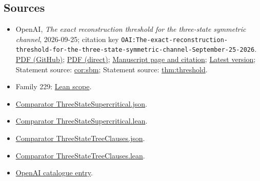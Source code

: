 \documentclass[11pt]{article}
\begin{document}
\subsection{Sources}
\begin{itemize}
\item OpenAI, \emph{The exact reconstruction threshold for the three-state symmetric channel}, 2026-09-25; citation key \texttt{OAI:The-exact-reconstruction-threshold-for-the-three-state-symmetric-channel-September-25-2026}. \href{https://github.com/openai/math/blob/adc7f1241b42e322a6451854ab7e4b4c146bf78a/preprints/The-exact-reconstruction-threshold-for-the-three-state-symmetric-channel-September-25-2026/paper.pdf}{PDF (GitHub)}; \href{https://github.com/openai/math/raw/adc7f1241b42e322a6451854ab7e4b4c146bf78a/preprints/The-exact-reconstruction-threshold-for-the-three-state-symmetric-channel-September-25-2026/paper.pdf}{PDF (direct)}; \href{https://github.com/openai/math/blob/adc7f1241b42e322a6451854ab7e4b4c146bf78a/preprints/The-exact-reconstruction-threshold-for-the-three-state-symmetric-channel-September-25-2026/README.md}{Manuscript page and citation}; \href{https://github.com/openai/math/blob/main/preprints/The-exact-reconstruction-threshold-for-the-three-state-symmetric-channel-September-25-2026/paper.pdf}{Latest version}; Statement source: \href{https://github.com/openai/math/blob/adc7f1241b42e322a6451854ab7e4b4c146bf78a/preprints/The-exact-reconstruction-threshold-for-the-three-state-symmetric-channel-September-25-2026/build/sections/01-introduction.tex\#L203}{cor:sbm}; Statement source: \href{https://github.com/openai/math/blob/adc7f1241b42e322a6451854ab7e4b4c146bf78a/preprints/The-exact-reconstruction-threshold-for-the-three-state-symmetric-channel-September-25-2026/build/sections/01-introduction.tex\#L44}{thm:threshold}.
\item Family 229: \href{https://github.com/openai/math/blob/adc7f1241b42e322a6451854ab7e4b4c146bf78a/lean/docs/229.md}{Lean scope}.
\item \href{https://github.com/openai/math/blob/adc7f1241b42e322a6451854ab7e4b4c146bf78a/lean/ComparatorChallenges/ThreeStateSupercritical.json}{Comparator ThreeStateSupercritical.json}.
\item \href{https://github.com/openai/math/blob/adc7f1241b42e322a6451854ab7e4b4c146bf78a/lean/ComparatorChallenges/ThreeStateSupercritical.lean}{Comparator ThreeStateSupercritical.lean}.
\item \href{https://github.com/openai/math/blob/adc7f1241b42e322a6451854ab7e4b4c146bf78a/lean/ComparatorChallenges/ThreeStateTreeClauses.json}{Comparator ThreeStateTreeClauses.json}.
\item \href{https://github.com/openai/math/blob/adc7f1241b42e322a6451854ab7e4b4c146bf78a/lean/ComparatorChallenges/ThreeStateTreeClauses.lean}{Comparator ThreeStateTreeClauses.lean}.
\item \href{https://github.com/openai/math/blob/adc7f1241b42e322a6451854ab7e4b4c146bf78a/CONTENTS.md}{OpenAI catalogue entry}.
\end{itemize}
\end{document}

